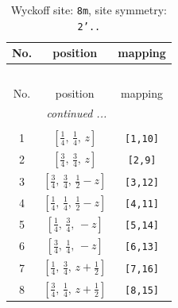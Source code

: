 \documentclass[fleqn,8pt]{jsarticle}
\begin{document}
\begin{longtable}{ccc}
\caption{Wyckoff site: {\tt 8m}, site symmetry: {\tt 2'..}}
 \\
 \hline \hline
No. & position & mapping \\ \hline \endfirsthead

\multicolumn{2}{l}{\tablename\ \thetable{}} \\
 \hline \hline
No. & position & mapping \\ \hline \endhead

 \hline \hline
\multicolumn{2}{r}{\footnotesize\it continued ...} \\ \endfoot

 \hline \hline
\multicolumn{2}{r}{} \\ \endlastfoot

1 & $\left[ \frac{1}{4},\, \frac{1}{4},\, z \right]$ & {\tt [1,10]} \\ \hline
2 & $\left[ \frac{3}{4},\, \frac{3}{4},\, z \right]$ & {\tt [2,9]} \\ \hline
3 & $\left[ \frac{3}{4},\, \frac{3}{4},\, \frac{1}{2} - z \right]$ & {\tt [3,12]} \\ \hline
4 & $\left[ \frac{1}{4},\, \frac{1}{4},\, \frac{1}{2} - z \right]$ & {\tt [4,11]} \\ \hline
5 & $\left[ \frac{1}{4},\, \frac{3}{4},\, - z \right]$ & {\tt [5,14]} \\ \hline
6 & $\left[ \frac{3}{4},\, \frac{1}{4},\, - z \right]$ & {\tt [6,13]} \\ \hline
7 & $\left[ \frac{1}{4},\, \frac{3}{4},\, z + \frac{1}{2} \right]$ & {\tt [7,16]} \\ \hline
8 & $\left[ \frac{3}{4},\, \frac{1}{4},\, z + \frac{1}{2} \right]$ & {\tt [8,15]} \\
\end{longtable}
\renewcommand{\arraystretch}{1.2}
\end{document}
